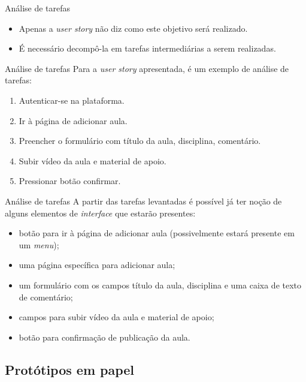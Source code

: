 \documentclass[11pt]{beamer}
\begin{document}
    \begin{frame}{Análise de tarefas}
      \begin{itemize}
        \item Apenas a \textit{user story} não diz como este objetivo será realizado.
        \item É necessário decompô-la em tarefas intermediárias a serem realizadas.
      \end{itemize}
    \end{frame}

    \begin{frame}{Análise de tarefas}
      Para a \textit{user story} apresentada, é um exemplo de análise de tarefas:
      \begin{enumerate}
        \item Autenticar-se na plataforma.
        \item Ir à página de adicionar aula.
        \item Preencher o formulário com título da aula, disciplina, comentário.
        \item Subir vídeo da aula e material de apoio.
        \item Pressionar botão confirmar.
      \end{enumerate}
    \end{frame}

    \begin{frame}{Análise de tarefas}
      A partir das tarefas levantadas é possível já ter noção de alguns elementos de \textit{interface} que estarão presentes:
      \begin{itemize}
        \item botão para ir à página de adicionar aula (possivelmente estará presente em um \textit{menu});
        \item uma página específica para adicionar aula;
        \item um formulário com os campos título da aula, disciplina e uma caixa de texto de comentário;
        \item campos para subir vídeo da aula e material de apoio;
        \item botão para confirmação de publicação da aula. 
      \end{itemize}
    \end{frame}

    \subsection{Protótipos em papel}
\end{document}
